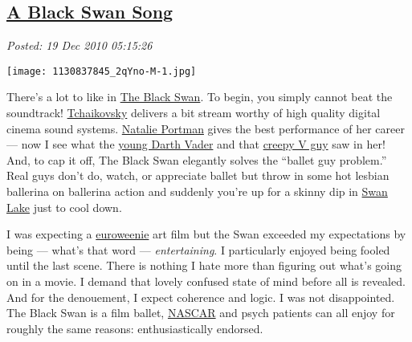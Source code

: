 %

\subsection*{\href{https://bakerjd99.wordpress.com/2010/12/19/a-black-swan-song/}{A Black Swan Song}}


\noindent\emph{Posted: 19 Dec 2010 05:15:26}
\vspace{6pt}

\captionsetup[floatingfigure]{labelformat=empty}
\begin{floatingfigure}[l]{0.23\textwidth}
\centering
\texttt{[image: 1130837845\_2qYno-M-1.jpg]}
\label{fig:985X0}
\end{floatingfigure}There's a lot to like in
\href{http://www.foxsearchlight.com/blackswan/}{The Black Swan}. To
begin, you simply cannot beat the soundtrack!
\href{http://www.classical.net/music/comp.lst/tchaikovsky.php}{Tchaikovsky}
delivers a bit stream worthy of high quality digital cinema sound
systems. \href{http://www.natalieportman.com/}{Natalie Portman} gives
the best performance of her career --- now I see what the
\href{http://www.starwars.com/databank/character/anakinskywalker/}{young
Darth Vader} and that
\href{http://www.rottentomatoes.com/m/v\_for\_vendetta/}{creepy V guy}
saw in her! And, to cap it off, The Black Swan elegantly solves the
``ballet guy problem.'' Real guys don't do, watch, or appreciate ballet
but throw in some hot lesbian ballerina on ballerina action and suddenly
you're up for a skinny dip in
\href{http://www.youtube.com/watch?v=3bYTomI-Uiw}{Swan Lake} just to
cool down.

I was expecting a
\href{http://www.urbandictionary.com/define.php?term=euroweenie}{euroweenie}
art film but the Swan exceeded my expectations by being --- what's that
word --- \emph{entertaining}. I particularly enjoyed being fooled until
the last scene. There is nothing I hate more than figuring out what's going
on in a movie. I demand that lovely confused state of mind before all is
revealed. And for the denouement, I expect coherence and logic. I was
not disappointed. The Black Swan is a film ballet,
\href{http://auto-racing.speedtv.com/article/alms-black-swan-confirms-porsche-gt-entry/}{NASCAR}
and psych patients can all enjoy for roughly the same reasons:
enthusiastically endorsed.




%